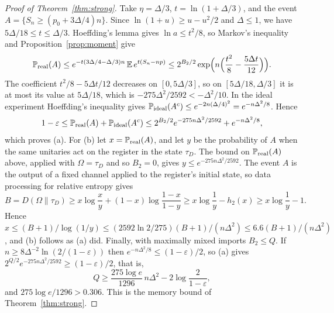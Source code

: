 \documentclass[11pt]{article}
\theoremstyle{definition}
\theoremstyle{remark}
\newcommand{\E}{\mathbb E}
\newcommand{\Prob}{\mathbb P}
\newcommand{\eps}{\varepsilon}
\begin{document}
\begin{proof}[Proof of Theorem~\ref{thm:strong}]
Take $\eta=\Delta/3$, $t=\ln(1+\Delta/3)$, and the event $A=\{S_n\ge(p_0+3\Delta/4)n\}$. Since $\ln(1+u)\ge u-u^2/2$ and $\Delta\le1$, we have $5\Delta/18\le t\le\Delta/3$. Hoeffding's lemma gives $\ln a\le t^2/8$, so Markov's inequality and Proposition~\ref{prop:moment} give
\[
 \Prob_{\rm real}(A)\le e^{-t(3\Delta/4-\Delta/3)n}\,\E\,e^{t(S_n-np)}\le2^{B_2/2}\exp\Bigl(n\Bigl(\frac{t^2}8-\frac{5\Delta t}{12}\Bigr)\Bigr).
\]
The coefficient $t^2/8-5\Delta t/12$ decreases on $[0,5\Delta/3]$, so on $[5\Delta/18,\Delta/3]$ it is at most its value at $5\Delta/18$, which is $-275\Delta^2/2592<-\Delta^2/10$. In the ideal experiment Hoeffding's inequality gives $\Prob_{\rm ideal}(A^c)\le e^{-2n(\Delta/4)^2}=e^{-n\Delta^2/8}$. Hence
\[
 1-\eps\le\Prob_{\rm real}(A)+\Prob_{\rm ideal}(A^c)\le2^{B_2/2}e^{-275n\Delta^2/2592}+e^{-n\Delta^2/8},
\]
which proves (a). For (b) let $x=\Prob_{\rm real}(A)$, and let $y$ be the probability of $A$ when the same unitaries act on the register in the state $\tau_D$. The bound on $\Prob_{\rm real}(A)$ above, applied with $\Omega=\tau_D$ and so $B_2=0$, gives $y\le e^{-275n\Delta^2/2592}$. The event $A$ is the output of a fixed channel applied to the register's initial state, so data processing for relative entropy gives
\[
 B=D(\Omega\|\tau_D)\ge x\log\frac xy+(1-x)\log\frac{1-x}{1-y}\ge x\log\frac1y-h_2(x)\ge x\log\frac1y-1.
\]
Hence $x\le(B+1)/\log(1/y)\le(2592\ln2/275)(B+1)/(n\Delta^2)\le6.6(B+1)/(n\Delta^2)$, and (b) follows as (a) did. Finally, with maximally mixed imports $B_2\le Q$. If $n\ge8\Delta^{-2}\ln(2/(1-\eps))$ then $e^{-n\Delta^2/8}\le(1-\eps)/2$, so (a) gives $2^{Q/2}e^{-275n\Delta^2/2592}\ge(1-\eps)/2$, that is,
\[
 Q\ge\frac{275\log e}{1296}\,n\Delta^2-2\log\frac2{1-\eps},
\]
and $275\log e/1296>0.306$. This is the memory bound of Theorem~\ref{thm:strong}.
\end{proof}
\end{document}

